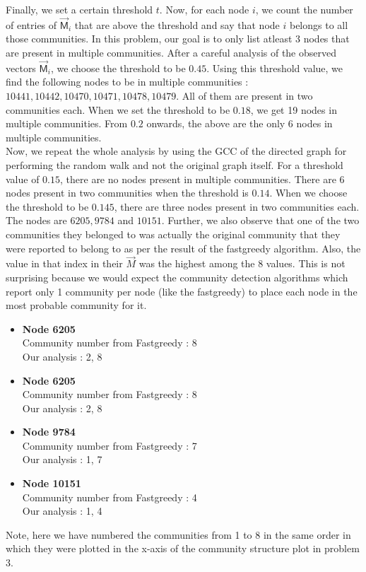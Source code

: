 \documentclass{article}
\newcommand{\M}{\mathsf{M}}
\begin{document}
Finally, we set a certain threshold $t$. Now, for each node $i$, we count the number of entries of $\vec{\M}_i$ that 
are above the threshold and say that node $i$ belongs to all those communities. In this problem, our goal is to only list 
atleast 3 nodes that are present in multiple communities. After a careful analysis of the observed vectors $\vec{\M}_i$,
we choose the threshold to be $0.45$. Using this threshold value, we find the following nodes to be in multiple communities :
$10441,10442,10470,10471,10478,10479$. All of them are present in two communities each.
When we set the threshold to be $0.18$, we get 19 nodes in multiple communities. From $0.2$
onwards, the above are the only 6 nodes in multiple communities.\\

Now, we repeat the whole analysis by using the GCC of the directed graph for performing the random walk and 
not the original graph itself. For a threshold value of $0.15$, there are no nodes present in multiple communities.
There are 6 nodes present in two communities when the threshold is $0.14$. When we choose the threshold to be
$0.145$, there are three nodes present in two communities each. The nodes are $6205,9784$ and $10151$. 
Further, we also
observe that one of the two communities they belonged to was actually the original community that they were reported
to belong to as per the result of the fastgreedy algorithm. Also, the value in that index in their $\vec{M}$ was the 
highest among the 8 values. This is not surprising because we would expect the community detection algorithms which
report only 1 community per node (like the fastgreedy) to place each node in the most probable community for it.
\begin{itemize}
 \item \textbf{Node 6205}\\
 Community number from Fastgreedy : 8\\
 Our analysis : 2, 8
 
 \item \textbf{Node 6205}\\
 Community number from Fastgreedy : 8\\
 Our analysis : 2, 8
 
 \item \textbf{Node 9784}\\
 Community number from Fastgreedy : 7\\
 Our analysis : 1, 7
 
 \item \textbf{Node 10151}\\
 Community number from Fastgreedy : 4\\
 Our analysis : 1, 4
\end{itemize}
Note, here we have numbered the communities from 1 to 8 in the same order in which they were plotted in the x-axis
of the community structure plot in problem 3.\\
\end{document}
